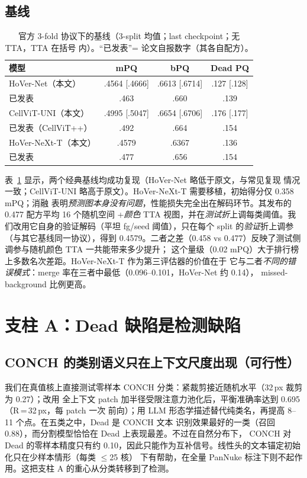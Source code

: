 \documentclass[11pt]{article}
\begin{document}
\subsection{基线}
\label{sec:baselines}

\begin{table}[t]
\centering\small
\caption{官方 3-fold 协议下的基线（3-split 均值；last checkpoint；无 TTA，TTA 在括号
内）。“已发表”= 论文自报数字（其各自配方）。}
\label{tab:baselines}
\begin{tabular}{lccc}
\toprule
模型 & mPQ & bPQ & Dead PQ \\
\midrule
HoVer-Net（本文）      & .4564 [.4666] & .6613 [.6714] & .127 [.128] \\
\quad 已发表            & .463 & .660 & .139 \\
CellViT-UNI（本文）    & .4995 [.5047] & .6654 [.6706] & .176 [.177] \\
\quad 已发表（CellViT++）& .492 & .664 & .154 \\
HoVer-NeXt-T（本文）   & .4579 & .6367 & .136 \\
\quad 已发表            & .477 & .656 & .154 \\
\bottomrule
\end{tabular}
\end{table}

表~\ref{tab:baselines} 显示，两个经典基线均成功复现（HoVer-Net 略低于原文，与常见复现
情况一致；CellViT-UNI 略高于原文）。HoVer-NeXt-T 需要移植，初始得分仅 0.358 mPQ；消融
表明\emph{预测图本身没有问题}，性能损失完全出在解码环节。其发布的 0.477 配方平均 16 个随机空间
+\emph{颜色} TTA 视图，并在\emph{测试折}上调每类阈值。我们改用它自身的验证解码（平坦
fg/seed 阈值），只在每个 split 的\emph{验证}折上调参（与其它基线同一协议），得到
0.4579。二者之差（0.458 vs 0.477）反映了测试侧调参与随机颜色 TTA 一共能带来多少提升；
这个量级（0.02 mPQ）大于排行榜上多数名次差距。HoVer-NeXt-T 作为第三评估器的价值在于
它与二者\emph{不同的错误模式}：merge 率在三者中最低（0.096--0.101，HoVer-Net 约 0.14），
missed-background 比例更高。

\section{支柱 A：Dead 缺陷是检测缺陷}
\label{sec:pillarA}

\subsection{CONCH 的类别语义只在上下文尺度出现（可行性）}
我们在真值核上直接测试零样本 CONCH 分类：紧裁剪接近随机水平（32\,px 裁剪为 0.27）；改用
全上下文 patch 加半径受限注意力池化后，平衡准确率达到 0.695（R\,=\,32\,px，每 patch 一次
前向）；用 LLM 形态学描述替代纯类名，再提高 8--11 个点。在五类之中，Dead 是 CONCH 文本
识别效果最好的一类（召回 0.88），而分割模型恰恰在 Dead 上表现最差。不过在自然分布下，
CONCH 对 Dead 的零样本精度只有约 0.10，因此只能作为互补信号。线性头的文本锚定初始化只在少样本情形（每类 $\le$25 核）
下有帮助，在全量 PanNuke 标注下则不起作用。这把支柱 A 的重心从分类转移到了检测。
\end{document}
